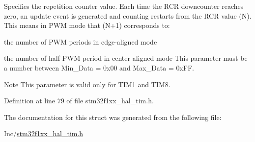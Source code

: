 Specifies the repetition counter value. Each time the R\+CR downcounter reaches zero, an update event is generated and counting restarts from the R\+CR value (N). This means in P\+WM mode that (N+1) corresponds to\+:
\begin{DoxyItemize}
\item the number of P\+WM periods in edge-\/aligned mode
\item the number of half P\+WM period in center-\/aligned mode This parameter must be a number between Min\+\_\+\+Data = 0x00 and Max\+\_\+\+Data = 0x\+FF. \begin{DoxyNote}{Note}
This parameter is valid only for T\+I\+M1 and T\+I\+M8. 
\end{DoxyNote}

\end{DoxyItemize}

Definition at line 79 of file stm32f1xx\+\_\+hal\+\_\+tim.\+h.



The documentation for this struct was generated from the following file\+:\begin{DoxyCompactItemize}
\item 
Inc/\hyperlink{stm32f1xx__hal__tim_8h}{stm32f1xx\+\_\+hal\+\_\+tim.\+h}\end{DoxyCompactItemize}

